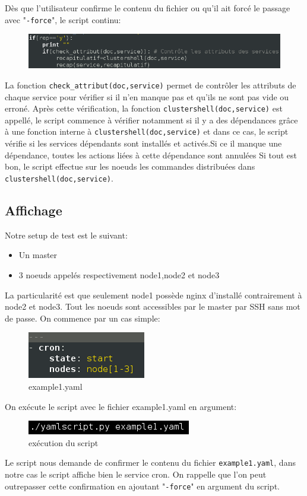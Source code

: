 \documentclass[a4paper,11pt]{article}
\begin{document}
\pagebreak
\noindent
Dès que l'utilisateur confirme le contenu du fichier ou qu'il ait forcé le passage avec "\verb?-force?", le script continu: 
\smallbreak
\begin{figure}[hbtp]
\centering
\includegraphics[scale=0.7]{clustershell_yaml.png}
\end{figure}
\smallbreak

\noindent
La fonction \verb?check_attribut(doc,service)? permet de contrôler les attributs de chaque service pour vérifier si il n'en manque pas et qu'ils ne sont pas vide ou erroné.
\smallbreak
\noindent
Après cette vérification, la fonction \verb?clustershell(doc,service)? est appellé, le script commence à vérifier notamment si il y a des dépendances grâce à une fonction interne à \verb?clustershell(doc,service)?  et dans ce cas, le script vérifie si les services dépendants sont installés et activés.Si ce il manque une dépendance, toutes les actions liées à cette dépendance sont annulées Si tout est bon, le script effectue sur les noeuds les commandes distribuées dans \verb?clustershell(doc,service)?.


\subsection{Affichage}
\label{sub:4.5}

Notre setup de test est le suivant: 
\begin{itemize}
\item Un master
\item 3 noeuds appelés respectivement node1,node2 et node3
\end{itemize}
La particularité est que seulement node1 possède nginx d'installé contrairement à node2 et node3.
\smallbreak
\noindent
Tout les noeuds sont accessibles par le master par SSH sans mot de passe.
On commence par un cas simple:
\smallbreak
\begin{figure}[hbtp]
\centering
\includegraphics[scale=0.7]{example1_yaml.png}
\caption{example1.yaml}
\end{figure}
\noindent
On exécute le script avec le fichier example1.yaml en argument:
\smallbreak
\begin{figure}[hbtp]
\centering
\includegraphics[scale=0.7]{execution_yaml.png}
\caption{exécution du script}
\end{figure}
\noindent
Le script nous demande de confirmer le contenu du fichier \verb?example1.yaml?, dans notre cas le script affiche bien le service cron. On rappelle que l'on peut outrepasser cette confirmation en ajoutant "\verb?-force?" en argument du script.
\smallbreak
\end{document}
